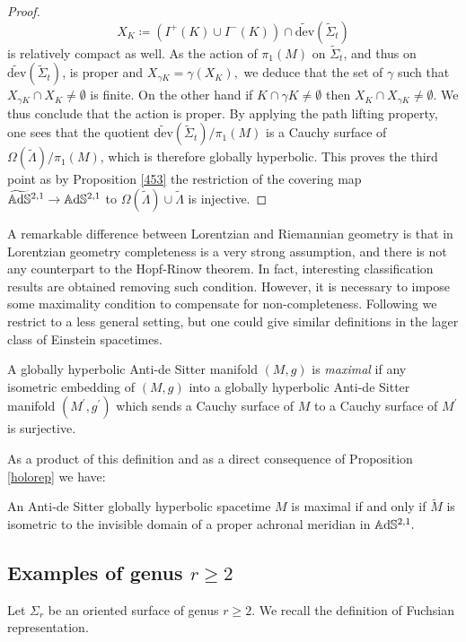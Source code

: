 \begin{proof}
    \[
        X_K\coloneqq (I^+(K)\cup I^-(K))\cap \widetilde{\text{dev}}(\widetilde{\Sigma}_t) 
    \]   
    is relatively compact as well. As the action of $\pi_1(M)$ on $\widetilde{\Sigma}_t$, and thus on $\widetilde{\text{dev}}(\widetilde{\Sigma}_t)$, is proper and $X_{\gamma K}=\gamma(X_K),$ we deduce that the set of $\gamma$ such that $X_{\gamma K}\cap X_K\neq\emptyset$ is finite. On the other hand if $K\cap \gamma K\neq\emptyset$ then $X_K\cap X_{\gamma K}\neq \emptyset.$ We thus conclude that the action is proper. By applying the path lifting property, one sees that the quotient $\widetilde{\text{dev}}(\widetilde{\Sigma}_t)/\pi_1(M)$ is a Cauchy surface of $\Omega(\widetilde{\Lambda})/\pi_1(M)$, which is therefore globally hyperbolic. This proves the third point as by Proposition \ref{453} the restriction of the covering map $\widetilde{\mathbb{A}\mathrm{d}\mathbb{S}}{}^{2,1}\to \mathbb{A}\mathrm{d}\mathbb{S}^{2,1}$ to $\Omega(\widetilde{\Lambda})\cup \widetilde{\Lambda}$ is injective. 
\end{proof}

A remarkable difference between Lorentzian and Riemannian geometry is that in Lorentzian geometry completeness is a very strong assumption, and there is not any counterpart to the Hopf-Rinow theorem. In fact, interesting classification results are obtained removing such condition. However, it is necessary to impose some maximality condition to compensate for non-completeness. Following \cite{bonsanteseppi} we restrict to a less general setting, but one could give similar definitions in the lager class of Einstein spacetimes.

\begin{definition}
    A globally hyperbolic Anti-de Sitter manifold $(M,g)$ is \textit{maximal} if any isometric embedding of $(M,g)$ into a globally hyperbolic Anti-de Sitter manifold $(M^{\prime},g^{\prime})$ which sends a Cauchy surface of $M$ to a Cauchy surface of $M^{\prime}$ is surjective.
\end{definition}

As a product of this definition and as a direct consequence of Proposition \ref{holorep} we have:

\begin{corollary}
An Anti-de Sitter globally hyperbolic spacetime $M$ is maximal if and only if $\widetilde{M}$ is isometric to the invisible domain of a proper achronal meridian in $\mathbb{A}\mathrm{d}\mathbb{S}^{2,1}.$
\end{corollary}



\subsection{Examples of genus $r\geq 2$}\label{hasteccato}
Let $\Sigma_r$ be an oriented surface of genus $r\geq 2.$ We recall the definition of Fuchsian representation. 

